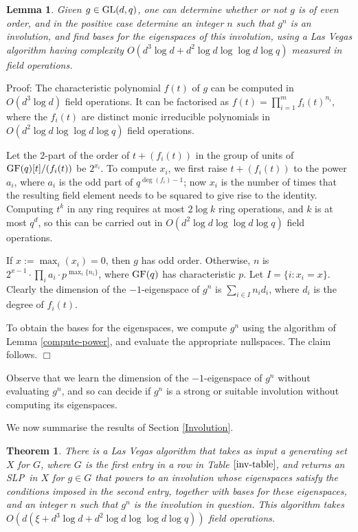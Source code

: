 \documentclass[12pt]{article}
\newtheorem{lemma}[definition]{Lemma}
\newtheorem{theorem}[definition]{Theorem}
\newenvironment{proof}{\normalsize {\sc Proof}:}{{\hfill $\Box$ \\}}
\def\GL{{\rm GL}}
\def\Oh{O}  %
\def\GF{{\rm GF}}
\def\SLP{{\rm SLP}}
\begin{document}
\begin{lemma}\label{Eigenspace}
Given $g\in\GL(d,q)$, one can determine whether or not $g$ is of even order,
and in the positive case determine an integer $n$ such that $g^n$ is an
involution, and find bases for the eigenspaces of this involution,
using a Las Vegas algorithm having complexity
$\Oh(d^3\log d + d^2 \log d\log \log d\log q)$ 
measured in field operations.
\end{lemma}
\begin{proof}
The characteristic polynomial $f(t)$ of $g$ can be computed 
in $\Oh(d^3 \log d)$ field operations. 
It can be factorised as $f(t)=\prod_{i=1}^mf_i(t)^{n_i}$, where the
$f_i(t)$ are distinct monic irreducible polynomials
in $\Oh(d^2 \log d \log\log d\log q)$ field operations. 

Let the $2$-part of the order of $t+(f_i(t))$ in the group 
of units of $\GF(q)[t]/(f_i(t))$ be $2^{x_i}$. 
To compute $x_i$, we first raise $t+(f_i(t))$ to the power $a_i$, where
$a_i$ is the odd part of $q^{\deg (f_i)-1}$; now 
$x_i$ is the number of times that
the resulting field element needs to be squared to give rise to the identity.
Computing $t^k$ in any ring requires at most $2\log k$
ring operations, and $k$ is at most $q^d$, so this can be carried out in 
$\Oh(d^2\log d \log \log d \log q)$ field operations.

If $x := \max_i(x_i) = 0$, then $g$ has odd order.
Otherwise, $n$ is 
$2^{x-1} \cdot \prod_i a_i  \cdot p^{\max_i{\{n_i\}}}$, where 
$\GF(q)$ has characteristic $p$.
Let $I=\{i:x_i=x\}$. 
Clearly the dimension of the $-1$-eigenspace
of $g^n$ is $\sum_{i\in I}n_id_i$, where $d_i$ is the degree of $f_i(t)$.  

To obtain the bases for the eigenspaces, 
we compute $g^n$ using the algorithm of Lemma 
\ref{compute-power}, and evaluate the appropriate nullspaces.
The claim follows.
\end{proof}

Observe that we learn the dimension of the $-1$-eigenspace of 
$g^n$ without evaluating $g^n$, and so can 
decide if $g^n$ is a strong or suitable involution without
computing its eigenspaces.

We now summarise the results of Section \ref{Involution}.
\begin{theorem}\label{Corollary5.1}
There is a Las Vegas algorithm that takes as input a generating set
$X$ for $G$, where $G$ is the first entry in a row in Table $\ref{inv-table}$,
and returns an \SLP\ in $X$ for $g\in G$
that powers to an involution whose eigenspaces satisfy the conditions
imposed in the second entry, together with bases for these eigenspaces,
and an integer $n$ such that $g^n$ is the involution in question. 
This algorithm takes 
$\Oh(d(\xi+d^3 \log d + d^2 \log d\log \log d\log q))$ 
field operations.
\end{theorem}
\end{document}
